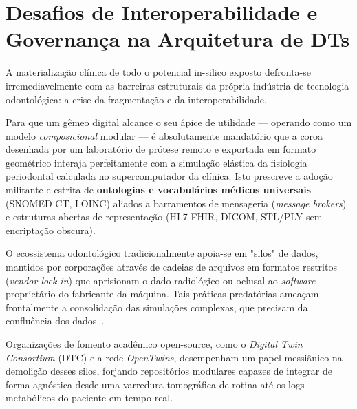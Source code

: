 \section{Desafios de Interoperabilidade e Governança na Arquitetura de DTs}

A materialização clínica de todo o potencial in-silico exposto defronta-se irremediavelmente com as barreiras estruturais da própria indústria de tecnologia odontológica: a crise da fragmentação e da interoperabilidade.

Para que um gêmeo digital alcance o seu ápice de utilidade — operando como um modelo \textit{composicional} modular — é absolutamente mandatório que a coroa desenhada por um laboratório de prótese remoto e exportada em formato geométrico interaja perfeitamente com a simulação elástica da fisiologia periodontal calculada no supercomputador da clínica. Isto prescreve a adoção militante e estrita de \textbf{ontologias e vocabulários médicos universais} (SNOMED CT, LOINC) aliados a barramentos de mensageria (\textit{message brokers}) e estruturas abertas de representação (HL7 FHIR, DICOM, STL/PLY sem encriptação obscura).

O ecossistema odontológico tradicionalmente apoia-se em "silos" de dados, mantidos por corporações através de cadeias de arquivos em formatos restritos (\textit{vendor lock-in}) que aprisionam o dado radiológico ou oclusal ao \textit{software} proprietário do fabricante da máquina. Tais práticas predatórias ameaçam frontalmente a consolidação das simulações complexas, que precisam da confluência dos dados~\cite{robles2023opentwins}.


Organizações de fomento acadêmico open-source, como o \textit{Digital Twin Consortium} (DTC) e a rede \textit{OpenTwins}, desempenham um papel messiânico na demolição desses silos, forjando repositórios modulares capazes de integrar de forma agnóstica desde uma varredura tomográfica de rotina até os logs metabólicos do paciente em tempo real.
